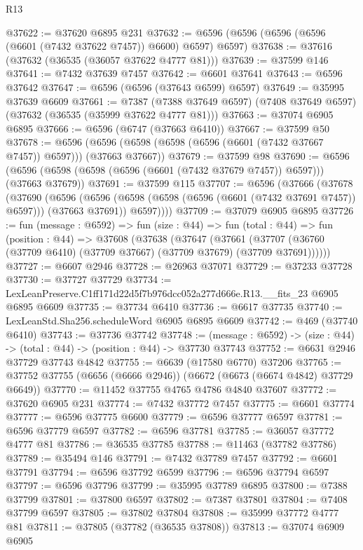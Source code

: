 \begin{lexlean}{R13}
\begin{coremodule}
@37622 := @37620 @6895 @231
@37632 := @6596 (@6596 (@6596 (@6596 (@6601 (@7432 @37622 @7457)) @6600) @6597) @6597)
@37638 := @37616 (@37632 (@36535 (@36057 @37622 @4777 @81)))
@37639 := @37599 @146
@37641 := @7432 @37639 @7457
@37642 := @6601 @37641
@37643 := @6596 @37642
@37647 := @6596 (@6596 (@37643 @6599) @6597)
@37649 := @35995 @37639 @6609
@37661 := @7387
    (@7388 @37649 @6597)
    (@7408 @37649 @6597)
    (@37632 (@36535 (@35999 @37622 @4777 @81)))
@37663 := @37074 @6905 @6895
@37666 := @6596 (@6747 (@37663 @6410))
@37667 := @37599 @50
@37678 := @6596 (@6596 (@6598 (@6598 (@6596 (@6601 (@7432 @37667 @7457)) @6597))) (@37663 @37667))
@37679 := @37599 @98
@37690 := @6596 (@6596 (@6598 (@6598 (@6596 (@6601 (@7432 @37679 @7457)) @6597))) (@37663 @37679))
@37691 := @37599 @115
@37707 := @6596
    (@37666
      (@37678
        (@37690
          (@6596
            (@6596 (@6598 (@6598 (@6596 (@6601 (@7432 @37691 @7457)) @6597))) (@37663 @37691))
            @6597))))
@37709 := @37079 @6905 @6895
@37726 := fun (message : @6592) =>
  fun (size : @44) =>
  fun (total : @44) =>
  fun (position : @44) =>
  @37608
    (@37638
      (@37647
        (@37661 (@37707 (@36760 (@37709 @6410) (@37709 @37667) (@37709 @37679) (@37709 @37691))))))
@37727 := @6607 @2946
@37728 := @26963 @37071
@37729 := @37233 @37728
@37730 := @37727 @37729
@37734 := LexLeanPreserve.C1ff171d22d5f7b976dcc052a277d666e.R13.__fits_23 @6905 @6895 @6609
@37735 := @37734 @6410
@37736 := @6617 @37735
@37740 := LexLeanStd.Sha256.scheduleWord @6905 @6895 @6609
@37742 := @469 (@37740 @6410)
@37743 := @37736 @37742
@37748 := (message : @6592) -> (size : @44) -> (total : @44) -> (position : @44) -> @37730 @37743
@37752 := @6631 @2946 @37729 @37743 @4842
@37755 := @6639 (@17580 @6770) @37206
@37765 := @37752 @37755 (@6656 (@6666 @2946)) (@6672 (@6673 (@6674 @4842) @37729 @6649))
@37770 := @11452 @37755 @4765 @4786 @4840 @37607
@37772 := @37620 @6905 @231
@37774 := @7432 @37772 @7457
@37775 := @6601 @37774
@37777 := @6596 @37775 @6600
@37779 := @6596 @37777 @6597
@37781 := @6596 @37779 @6597
@37782 := @6596 @37781
@37785 := @36057 @37772 @4777 @81
@37786 := @36535 @37785
@37788 := @11463 (@37782 @37786)
@37789 := @35494 @146
@37791 := @7432 @37789 @7457
@37792 := @6601 @37791
@37794 := @6596 @37792 @6599
@37796 := @6596 @37794 @6597
@37797 := @6596 @37796
@37799 := @35995 @37789 @6895
@37800 := @7388 @37799
@37801 := @37800 @6597
@37802 := @7387 @37801
@37804 := @7408 @37799 @6597
@37805 := @37802 @37804
@37808 := @35999 @37772 @4777 @81
@37811 := @37805 (@37782 (@36535 @37808))
@37813 := @37074 @6909 @6905

\end{coremodule}
\end{lexlean}
